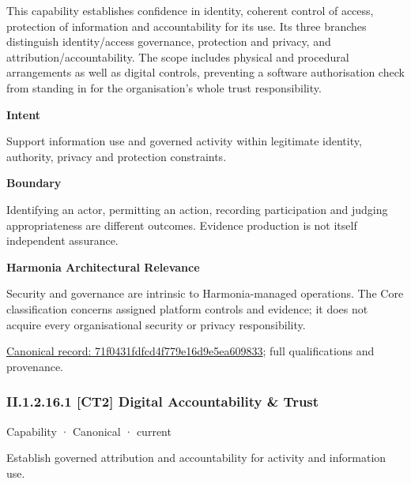 This capability establishes confidence in identity, coherent control of access, protection of information and accountability for its use. Its three branches distinguish identity/access governance, protection and privacy, and attribution/accountability. The scope includes physical and procedural arrangements as well as digital controls, preventing a software authorisation check from standing in for the organisation's whole trust responsibility.



\textbf{Intent}



Support information use and governed activity within legitimate identity, authority, privacy and protection constraints.



\textbf{Boundary}



Identifying an actor, permitting an action, recording participation and judging appropriateness are different outcomes. Evidence production is not itself independent assurance.



\textbf{Harmonia Architectural Relevance}



Security and governance are intrinsic to Harmonia-managed operations. The Core classification concerns assigned platform controls and evidence; it does not acquire every organisational security or privacy responsibility.


{\footnotesize \href{../../../../../../../continuum/strategy/capability/71f0431fdfcd4f779e16d9e5ea609833.md}{Canonical record: 71f0431fdfcd4f779e16d9e5ea609833}; full qualifications and provenance.}\par
\subsubsection*{II.1.2.16.1 [CT2] Digital Accountability \& Trust}
\label{navigation:II.1.2.16.1}

\label{element:9a600233ae1f4f3289c09a0b08ce029d}
{\small Capability · Canonical · current}\par

Establish governed attribution and accountability for activity and information use.



